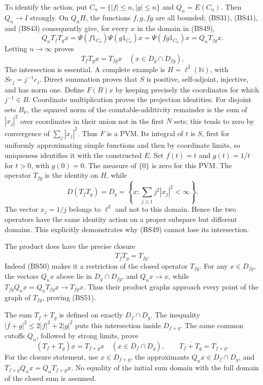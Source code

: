 \documentclass[
  11pt,
]{article}
\begin{document}
To identify the action, put \(C_n=\{|f|\leq n,|g|\leq n\}\) and
\(Q_n=E(C_n)\). Then \(Q_n\to I\) strongly. On \(Q_nH\), the functions
\(f,g,fg\) are all bounded; (BS31), (BS41), and (BS43) consequently
give, for every \(x\) in the domain in (BS49), \[
 Q_nT_fT_gx=\Psi(f1_{C_n})\Psi(g1_{C_n})x
           =\Psi(fg1_{C_n})x=Q_nT_{fg}x.
\] Letting \(n\to\infty\) proves \[
 T_fT_gx=T_{fg}x\quad(x\in D_g\cap D_{fg}).
 \tag{BS50}
\] The intersection is essential. A complete example is
\(H=\ell^2(\mathbb N)\), with \(Se_j=j^{-1}e_j\). Direct summation
proves that \(S\) is positive, self-adjoint, injective, and has norm
one. Define \(F(B)x\) by keeping precisely the coordinates for which
\(j^{-1}\in B\). Coordinate multiplication proves the projection
identities. For disjoint sets \(B_k\), the squared norm of the
countable-additivity remainder is the sum of \(|x_j|^2\) over
coordinates in their union not in the first \(N\) sets; this tends to
zero by convergence of \(\sum_j|x_j|^2\). Thus \(F\) is a PVM. Its
integral of \(t\) is \(S\), first for uniformly approximating simple
functions and then by coordinate limits, so uniqueness identifies it
with the constructed \(E\). Set \(f(t)=t\) and \(g(t)=1/t\) for \(t>0\),
with \(g(0)=0\). The measure of \(\{0\}\) is zero for this PVM. The
operator \(T_{fg}\) is the identity on \(H\), while \[
 D(T_fT_g)=D_g=\left\{x:\sum_{j\geq1}j^2|x_j|^2<\infty\right\}.
\] The vector \(x_j=1/j\) belongs to \(\ell^2\) and not to this domain.
Hence the two operators have the same identity action on a proper
subspace but different domains. This explicitly demonstrates why (BS49)
cannot lose its intersection.

The product does have the precise closure \[
 \overline{T_fT_g}=T_{fg}.
 \tag{BS51}
\] Indeed (BS50) makes it a restriction of the closed operator
\(T_{fg}\). For any \(x\in D_{fg}\), the vectors \(Q_nx\) above lie in
\(D_g\cap D_{fg}\), and \(Q_nx\to x\), while
\(T_{fg}Q_nx=Q_nT_{fg}x\to T_{fg}x\). Thus their product graphs approach
every point of the graph of \(T_{fg}\), proving (BS51).

The sum \(T_f+T_g\) is defined on exactly \(D_f\cap D_g\). The
inequality \(|f+g|^2\leq2|f|^2+2|g|^2\) puts this intersection inside
\(D_{f+g}\). The same common cutoffs \(Q_n\), followed by strong limits,
prove \[
 (T_f+T_g)x=T_{f+g}x\quad(x\in D_f\cap D_g),
 \qquad\overline{T_f+T_g}=T_{f+g}.
 \tag{BS52}
\] For the closure statement, use \(x\in D_{f+g}\), the approximants
\(Q_nx\in D_f\cap D_g\), and \(T_{f+g}Q_nx=Q_nT_{f+g}x\). No equality of
the initial sum domain with the full domain of the closed sum is
assumed.
\end{document}
